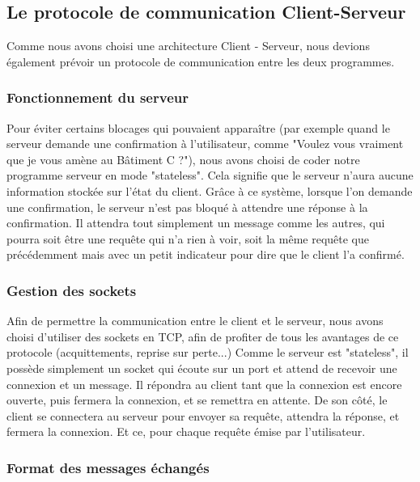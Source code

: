 \documentclass[a4paper,10pt]{report}
\begin{document}
      \subsection{Le protocole de communication Client-Serveur}

      {Comme nous avons choisi une architecture Client - Serveur, nous devions également prévoir un protocole de communication entre les deux programmes.}

        \subsubsection{Fonctionnement du serveur}
          {Pour éviter certains blocages qui pouvaient apparaître (par exemple quand le serveur demande une confirmation à l'utilisateur, comme "Voulez vous vraiment que je vous amène au Bâtiment C ?"), nous avons choisi de coder notre programme serveur en mode "stateless". Cela signifie que le serveur n'aura aucune information stockée sur l'état du client. Grâce à ce système, lorsque l'on demande une confirmation, le serveur n'est pas bloqué à attendre une réponse à la confirmation. Il attendra tout simplement un message comme les autres, qui pourra soit être une requête qui n'a rien à voir, soit la même requête que précédemment mais avec un petit indicateur pour dire que le client l'a confirmé.}

        \subsubsection{Gestion des sockets}
          {Afin de permettre la communication entre le client et le serveur, nous avons choisi d'utiliser des sockets en TCP, afin de profiter de tous les avantages de ce protocole (acquittements, reprise sur perte...)\newline}
          {Comme le serveur est "stateless", il possède simplement un socket qui écoute sur un port et attend de recevoir une connexion et un message. Il répondra au client tant que la connexion est encore ouverte, puis fermera la connexion, et se remettra en attente.\newline}
          {De son côté, le client se connectera au serveur pour envoyer sa requête, attendra la réponse, et fermera la connexion. Et ce, pour chaque requête émise par l'utilisateur.}

        \subsubsection{Format des messages échangés}
\end{document}
